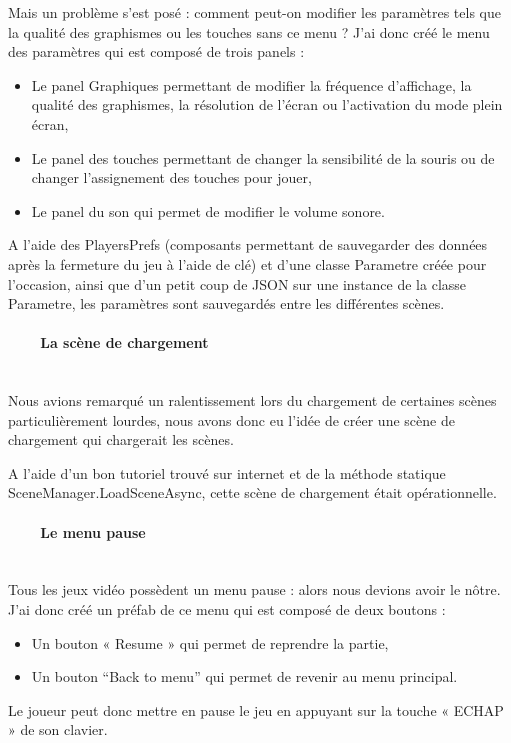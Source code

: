 \documentclass[titlepage, 13px, a4paper]{report}
\begin{document}
Mais un problème s’est posé : comment peut-on modifier les paramètres tels que la qualité des graphismes ou les touches sans ce menu ?
J’ai donc créé le menu des paramètres qui est composé de trois panels : \\
{\begin{itemize}
	\item Le panel Graphiques permettant de modifier la fréquence d’affichage, la qualité des graphismes, la résolution 
	de l’écran ou l’activation du mode plein écran,
	\item Le panel des touches permettant de changer la sensibilité de la souris ou de changer l’assignement des touches pour jouer,
	\item Le panel du son qui permet de modifier le volume sonore. \\
\end{itemize}}
A l’aide des PlayersPrefs (composants permettant de sauvegarder des données après la fermeture du jeu à l’aide de clé) 
et d’une classe Parametre créée pour l’occasion, ainsi que d’un petit coup de JSON sur une instance de la classe Parametre, 
les paramètres sont sauvegardés entre les différentes scènes. \\


\paragraph{~~~~La scène de chargement} \hspace{0pt} \\
Nous avions remarqué un ralentissement lors du chargement de certaines scènes particulièrement lourdes, nous avons donc eu 
l’idée de créer une scène de chargement qui chargerait les scènes.

A l’aide d’un bon tutoriel trouvé sur internet et de la méthode statique SceneManager.LoadSceneAsync, cette scène 
de chargement était opérationnelle. \\


\paragraph{~~~~Le menu pause} \hspace{0pt} \\
Tous les jeux vidéo possèdent un menu pause : alors nous devions avoir le nôtre.
J’ai donc créé un préfab de ce menu qui est composé de deux boutons : \\
{\begin{itemize}
	\item Un bouton « Resume » qui permet de reprendre la partie,
	\item Un bouton “Back to menu” qui permet de revenir au menu principal. \\
\end{itemize}}
Le joueur peut donc mettre en pause le jeu en appuyant sur la touche « ECHAP » de son clavier. \\
\end{document}
